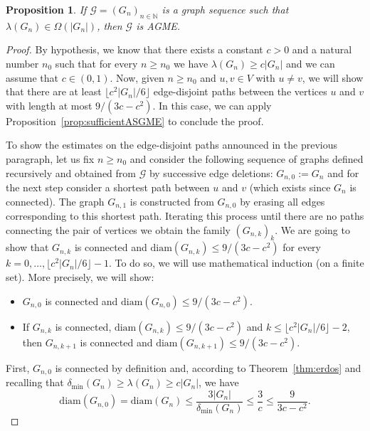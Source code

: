 \documentclass[a4paper,onecolumn,accepted=2024-12-14]{quantumarticle}
\newtheorem{proposition}[theorem]{Proposition}
\theoremstyle{plain}
\newcommand{\cG}{{\mathcal G}}         %
\newcommand{\N}{\mathbb{N}} %
\begin{document}
\begin{proposition}\label{th:lambda}
If $\cG=(G_n)_{n\in\N}$ is a graph sequence such that $\lambda(G_n)\in\Omega(|G_n|)$,
then $\cG$ is AGME.
\end{proposition}
\begin{proof}
By hypothesis, we know that there exists a constant $c>0$ and a natural number $n_0$ such that for every $n\geq n_0$ we have $\lambda(G_n)\geq c|G_n|$ and we can assume that $c\in (0,1)$. Now, given $n\geq n_0$ and $u, v\in V$ with $u\neq v$, we will show that there are at least $\lfloor c^2|G_n|/6\rfloor$ edge-disjoint paths between the vertices $u$ and $v$  with length at most $9/(3c-c^2)$. In this case, we can apply Proposition~\ref{prop:sufficientASGME} to conclude the proof.

To show the estimates on the edge-disjoint paths announced in the previous paragraph, let us fix $n\geq n_0$ and consider the following sequence of graphs defined recursively and obtained from $\cG$ by successive edge deletions: $G_{n,0}:=G_n$ and for the next step consider a shortest path between $u$
and $v$ (which exists since $G_n$ is connected). The graph $G_{n,1}$ is constructed from $G_{n,0}$ by erasing all edges corresponding to this shortest path. Iterating this process until there are no paths connecting the pair of vertices we obtain the family $(G_{n,k})_k$. We are going to show that $G_{n,k}$ is connected and $\textrm{diam}(G_{n,k})\leq 9/(3c-c^2)$ for every $k=0,\ldots , \lfloor c^2|G_n|/6\rfloor-1$. To do so, we will use mathematical induction (on a finite set). More precisely, we will show:
\begin{itemize}
\item[1.] $G_{n,0}$ is connected and $\textrm{diam}(G_{n,0})\leq 9/(3c-c^2)$.
\item[2.] If $G_{n,k}$ is connected, $\textrm{diam}(G_{n,k})\leq 9/(3c-c^2)$ and $k\leq \lfloor c^2|G_n|/6\rfloor-2$, then $G_{n,k+1}$ is connected and $\textrm{diam}(G_{n,k+1})\leq 9/(3c-c^2)$.
\end{itemize}

First, $G_{n,0}$ is connected by definition and, according to
Theorem~\ref{thm:erdos} and recalling that \linebreak $\delta_{\mathrm{min}}(G_n)\geq \lambda(G_n)\geq c|G_n|$, we have
\begin{equation}
\textrm{diam}(G_{n,0})=\textrm{diam}(G_{n})\leq \frac{3|G_n|}{\delta_{\mathrm{min}}(G_n)}\leq \frac{3}{c}\leq \frac{9}{3c-c^2}.
\end{equation}


\end{proof}
\end{document}
